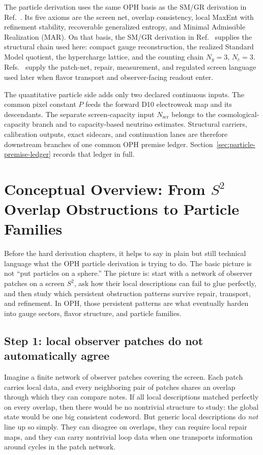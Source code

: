 \documentclass[11pt]{article}
\begin{document}
The particle derivation uses the same OPH basis as the SM/GR derivation in Ref.~\cite{ophcompact}. Its five
axioms are the screen net, overlap consistency, local MaxEnt with refinement stability,
recoverable generalized entropy, and Minimal Admissible Realization (MAR). On that basis, the
SM/GR derivation in Ref.~\cite{ophcompact} supplies the structural chain used here: compact gauge reconstruction, the realized
Standard Model quotient, the hypercharge lattice, and the counting chain \(N_g=3\), \(N_c=3\).
Refs.~\cite{ophconsensus,ophmicrophysics} supply the patch-net, repair, measurement, and
regulated screen language used later when flavor transport and observer-facing readout enter.

The quantitative particle side adds only two declared continuous inputs. The common pixel constant
\(P\) feeds the forward D10 electroweak map and its descendants. The separate screen-capacity
input \(N_{\mathrm{scr}}\) belongs to the cosmological-capacity branch and to capacity-based
neutrino estimates. Structural carriers, calibration outputs, exact sidecars, and continuation
lanes are therefore downstream branches of one common OPH premise ledger. Section~\ref{sec:particle-premise-ledger}
records that ledger in full.

\section{Conceptual Overview: From \texorpdfstring{$S^2$}{S2} Overlap Obstructions to Particle Families}

Before the hard derivation chapters, it helps to say in plain but still technical language what
the OPH particle derivation is trying to do. The basic picture is not ``put particles on a
sphere.'' The picture is: start with a network of observer patches on a screen \(S^2\), ask how
their local descriptions can fail to glue perfectly, and then study which persistent obstruction
patterns survive repair, transport, and refinement. In OPH, those persistent patterns
are what eventually harden into gauge sectors, flavor structure, and particle families.

\subsection{Step 1: local observer patches do not automatically agree}

Imagine a finite network of observer patches covering the screen. Each patch carries local data,
and every neighboring pair of patches shares an overlap through which they can compare notes. If
all local descriptions matched perfectly on every overlap, then there would be no nontrivial
structure to study: the global state would be one big consistent codeword. But generic local
descriptions do \emph{not} line up so simply. They can disagree on overlaps, they can require
local repair maps, and they can carry nontrivial loop data when one transports information around
cycles in the patch network.
\end{document}
